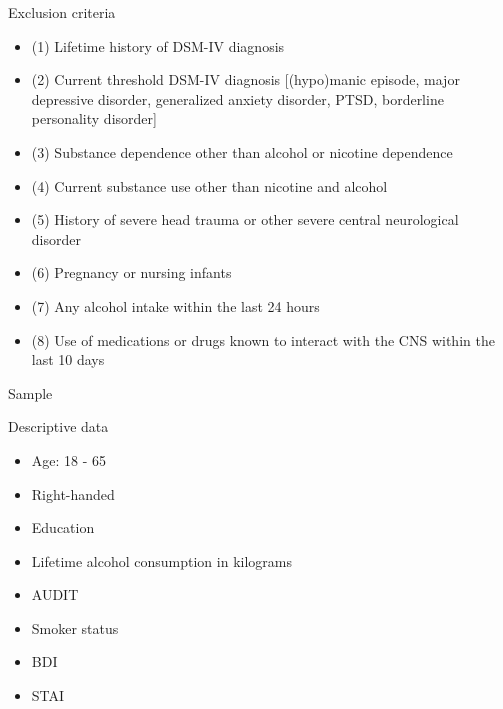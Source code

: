 \documentclass{bredelebeamer}
\begin{document}
\begin{frame}{Exclusion criteria}
\small
\begin{itemize}
    \item (1)	Lifetime history of DSM-IV diagnosis
\item (2)	Current threshold DSM-IV diagnosis [(hypo)manic episode, major depressive disorder, generalized anxiety disorder, PTSD, borderline personality disorder]
\item (3)	Substance dependence other than alcohol or nicotine dependence
\item (4)	Current substance use other than nicotine and alcohol 
\item (5)	History of severe head trauma or other severe central neurological disorder 
\item (6)	Pregnancy or nursing infants
\item (7)	Any alcohol intake within the last 24 hours
\item (8)	Use of medications or drugs known to interact with the CNS within the last 10 days
\end{itemize}   
\end{frame}


\begin{frame}{Sample}
\begin{exampleblock}{Descriptive data}
\begin{itemize}
\item Age: 18 - 65
\item Right-handed
\item Education
\item Lifetime alcohol consumption in kilograms
\item AUDIT
\item Smoker status
\item BDI
\item STAI
\end{itemize}
\end{exampleblock}
\end{frame}
\end{document}
